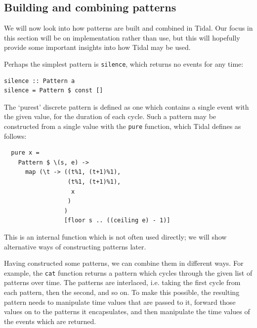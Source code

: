 \documentclass[authoryear]{sigplanconf}
\begin{document}
\subsection{Building and combining patterns}

We will now look into how patterns are built and combined in
Tidal. Our focus in this section will be on implementation rather than
use, but this will hopefully provide some important insights into how
Tidal may be used.

Perhaps the simplest pattern is \lstinline{silence}, which returns no
events for any time:

\begin{center}
\begin{minipage}{0.5\textwidth}
\begin{lstlisting}
silence :: Pattern a
silence = Pattern $ const []
\end{lstlisting}
\end{minipage}
\end{center}

The `purest' discrete pattern is defined as one which contains a
single event with the given value, for the duration of each
cycle. Such a pattern may be constructed from a single value with the
\lstinline{pure} function, which Tidal defines as follows:


\begin{center}
\begin{minipage}{0.5\textwidth}
\begin{lstlisting}
  pure x = 
    Pattern $ \(s, e) -> 
      map (\t -> ((t%1, (t+1)%1), 
                  (t%1, (t+1)%1),
                   x
                  )
                 )
                 [floor s .. ((ceiling e) - 1)]
\end{lstlisting}
\end{minipage}
\end{center}

This is an internal function which is not often used directly; we will
show alternative ways of constructing patterns later.


Having constructed some patterns, we can combine them in different
ways. For example, the \lstinline{cat} function returns a pattern
which cycles through the given list of patterns over time. The
patterns are interlaced, i.e. taking the first cycle from each
pattern, then the second, and so on. To make this possible, the
resulting pattern needs to manipulate time values that are passed to
it, forward those values on to the patterns it encapsulates, and then
manipulate the time values of the events which are returned.
\end{document}
